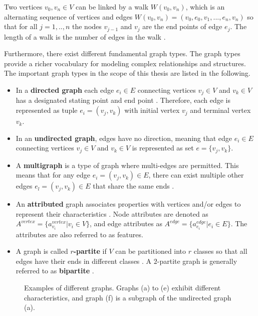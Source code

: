 Two vertices $v_0, v_n \in V$ can be linked by a walk $W(v_0, v_n)$, which is an alternating sequence of vertices and edges $W(v_0, v_n)=(v_0, e_0, v_1, ..., e_n, v_n)$ so that for all $j=1,..,n$ the nodes $v_{j-1}$ and $v_j$ are the end points of edge $e_j$. The length of a walk is the number of edges in the walk \cite{diestel_graph_2017}.

Furthermore, there exist different fundamental graph types. The graph types provide a richer vocabulary for modeling complex relationships and structures. The important graph types in the scope of this thesis are listed in the following.

\begin{itemize}
    \item In a \textbf{directed graph} each edge $e_i \in E$ connecting vertices $v_j \in V$ and $v_k \in V$ has a designated stating point and end point \cite{diestel_graph_2017}. Therefore, each edge is represented as tuple $e_i = (v_j, v_k)$ with initial vertex $v_j$ and terminal vertex $v_k$. 
    \item In an \textbf{undirected graph}, edges have no direction, meaning that edge $e_i \in E$ connecting vertices $v_j \in V$ and $v_k \in V$ is represented as set $e = \{v_j, v_k\}$.
    \item A \textbf{multigraph} is a type of graph where multi-edges are permitted. This means that for any edge $e_i = (v_j,v_k) \in E$, there can exist multiple other edges $e_l = (v_j,v_k) \in E$ that share the same ends \cite{kazemi_representation_2019}.
    \item An \textbf{attributed} graph associates properties with vertices and/or edges to represent their characteristics \cite{kazemi_representation_2019}. Node attributes are denoted as $A^{vertex} = \{a^{vertex}_{v_i} | v_i \in V\}$, and edge attributes as $A^{edge} = \{a^{edge}_{e_i} | e_i \in E\}$. The attributes are also referred to as features.
    \item A graph is called \textbf{$r$-partite} if $V$ can be partitioned into $r$ classes so that all edges have their ends in different classes \cite{diestel_graph_2017}. A $2$-partite graph is generally referred to as \textbf{bipartite} \cite{diestel_graph_2017}.
\end{itemize}

\begin{figure}[h]
        
    \caption{Examples of different graphs. Graphs (a) to (e) exhibit different characteristics, and graph (f) is a subgraph of the undirected graph (a).}
    \label{f_graphs}
\end{figure}


